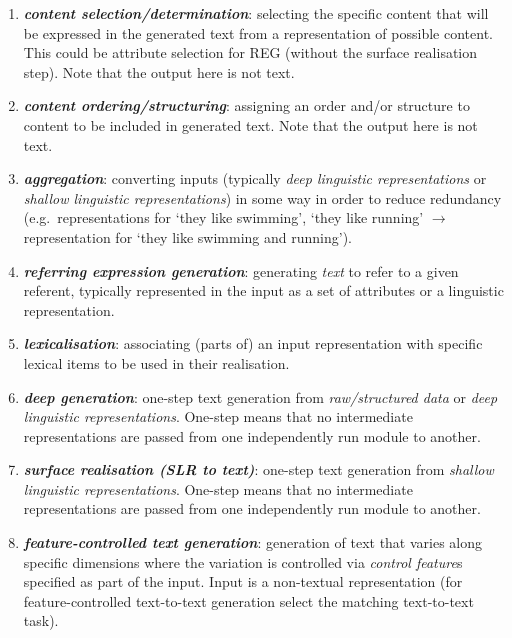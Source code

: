 \documentclass[11pt,a4paper]{article}
\newcommand{\egcvalue}[1]{\textbf{\textit{#1}}}
\begin{document}
\begin{enumerate}[itemsep=0cm,leftmargin=0.5cm,label={\small $\square$}]
    \item \egcvalue{content selection/determination}: selecting  the specific content that will be expressed in the generated text from a representation of possible content. This could be attribute selection for REG (without the surface realisation step). Note that the output here is not text.
    
    \item \egcvalue{content ordering/structuring}: assigning an order and/or structure to content to be included in generated text. Note that the output here is not text.
    
    \item \egcvalue{aggregation}: converting inputs (typically \textit{deep linguistic representations} or \textit{shallow linguistic representations}) in some way in order to reduce redundancy (e.g.\  representations for `they like swimming', `they like running' $\rightarrow$ representation for `they like swimming and running').
   
    \item \egcvalue{referring expression generation}: generating \textit{text} to refer to a given referent, typically represented in the input as a set of attributes or a linguistic representation. 
    
    \item \egcvalue{lexicalisation}: associating (parts of) an input representation with specific lexical items to be used in their realisation. 
    
    \item \egcvalue{deep generation}: one-step text generation from \textit{raw/structured data} or \textit{deep linguistic representations}. One-step means that no intermediate representations are passed from one independently run module to another.
    
    \item \egcvalue{surface realisation (SLR to text)}: one-step text generation from \textit{shallow linguistic representations}. One-step means that no intermediate representations are passed from one independently run module to another.
    
    \item \egcvalue{feature-controlled text generation}: generation of text that varies along specific dimensions where the variation is controlled via \textit{control feature}s specified as part of the input. Input is a non-textual representation (for feature-controlled text-to-text generation select the matching text-to-text task). 
    

\end{enumerate}
\end{document}
